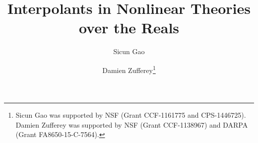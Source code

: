 \documentclass{llncs}
\begin{document}

\title{Interpolants in Nonlinear Theories over the Reals}
\author{Sicun Gao \and Damien Zufferey\thanks{Sicun Gao was supported by NSF (Grant CCF-1161775 and CPS-1446725). 
Damien Zufferey was supported by NSF (Grant CCF-1138967) and DARPA (Grant FA8650-15-C-7564).}}


\maketitle

\begin{abstract}

\end{abstract}










\appendix
%
\end{document}
